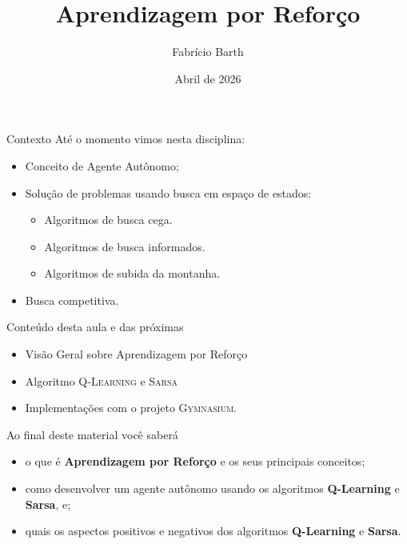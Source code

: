 \documentclass{beamer}
\begin{document}
\title{Aprendizagem por Reforço} 
\author{Fabrício Barth}
\date{Abril de 2026}

\maketitle

\begin{frame}{Contexto}
Até o momento vimos nesta disciplina:
\begin{itemize}
	\item Conceito de Agente Autônomo;
	\item Solução de problemas usando busca em espaço de estados:
	\begin{itemize}
		\item Algoritmos de busca cega.
		\item Algoritmos de busca informados.
		\item Algoritmos de subida da montanha.
	\end{itemize}
	\item Busca competitiva.
\end{itemize}
\end{frame}

\begin{frame}{Conteúdo desta aula e das próximas}
  \begin{itemize}
\item Visão Geral sobre Aprendizagem por Reforço
\item Algoritmo \textsc{Q-Learning} e \textsc{Sarsa}
\item Implementações com o projeto \textsc{Gymnasium}.
  \end{itemize}
\end{frame}

\begin{frame}{Ao final deste material você saberá}

	\begin{itemize}
	\item o que é \textbf{Aprendizagem por Reforço} e os seus principais conceitos;
	\item como desenvolver um agente autônomo usando os algoritmos \textbf{Q-Learning} e \textbf{Sarsa}, e;
	\item quais os aspectos positivos e negativos dos algoritmos \textbf{Q-Learning} e \textbf{Sarsa}.
	\end{itemize}

\end{frame}
\end{document}
